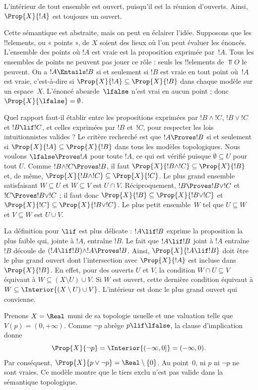 \documentclass[../../../include/open-logic-section]{subfiles}
\begin{document}
L'intérieur de tout ensemble est ouvert, puisqu'il est la réunion
d'ouverts. Ainsi, $\Prop{X}{!A}$ est toujours un ouvert.

Cette sémantique est abstraite, mais on peut en éclairer l'idée.
Supposons que les !!{element}s, ou « points », de $X$ soient des lieux
où l'on peut évaluer les énoncés. L'ensemble des points où $!A$ est
vraie est la proposition exprimée par~$!A$. Tous les ensembles de
points ne peuvent pas jouer ce rôle : seuls les !!{element}s de
$\Top{O}$ le peuvent. On a $!A \Entails !B$ si et seulement si $!B$
est vraie en tout point où~$!A$ est vraie, c'est-à-dire si
$\Prop{X}{!A} \subseteq \Prop{X}{!B}$ dans chaque modèle sur un
espace~$X$. L'énoncé absurde~$\lfalse$ n'est vrai en aucun point ;
donc $\Prop{X}{\lfalse} = \emptyset$.

Quel rapport faut-il établir entre les propositions exprimées par
$!B \land !C$, $!B \lor !C$ et $!B \lif !C$, et celles exprimées par
$!B$ et~$!C$, pour respecter les lois intuitionnistes valides ? Le
critère recherché est que $!A \Proves !B$ si et seulement si
$\Prop{X}{!A} \subseteq \Prop{X}{!B}$ dans tous les modèles
topologiques. Nous voulons $\lfalse \Proves !A$ pour toute $!A$,
ce qui est vérifié puisque $\emptyset \subseteq U$ pour tout $U$.
Comme $!B \land !C \Proves !B$, il faut
$\Prop{X}{!B \land !C} \subseteq \Prop{X}{!B}$ et, de même,
$\Prop{X}{!B \land !C} \subseteq \Prop{X}{!C}$. Le plus grand
ensemble satisfaisant $W \subseteq U$ et $W \subseteq V$ est
$U \cap V$. Réciproquement, $!B \Proves !B \lor !C$ et
$!C \Proves !B \lor !C$ ; il faut donc
$\Prop{X}{!B} \subseteq \Prop{X}{!B \lor !C}$ et
$\Prop{X}{!C} \subseteq \Prop{X}{!B \lor !C}$. Le plus petit
ensemble~$W$ tel que $U \subseteq W$ et $V \subseteq W$ est
$U \cup V$.

La définition pour $\lif$ est plus délicate : $!A \lif !B$ exprime la
proposition la plus faible qui, jointe à $!A$, entraîne $!B$. Le fait
que $!A \lif !B$ joint à $!A$ entraîne~$!B$ découle de
$(!A \lif !B) \land !A \Proves !B $. Ainsi, $\Prop{X}{!A \lif !B}$
doit être le plus grand ouvert dont l'intersection avec
$\Prop{X}{!A}$ est incluse dans $\Prop{X}{!B}$. En effet, pour
des ouverts $U$ et $V$, la condition $W\cap U\subseteq V$
équivaut à $W\subseteq (X\setminus U)\cup V$. Si $W$ est ouvert,
cette dernière condition équivaut à
$W\subseteq \Interior{(X\setminus U)\cup V}$. L'intérieur est
donc le plus grand ouvert qui convienne.

\begin{ex}
  Prenons $X=\Real$ muni de sa topologie usuelle et
  une valuation telle que $V(p)=(0,+\infty)$. Comme $\lnot p$
  abrège $p\lif\lfalse$, la clause d'implication donne
  \[
    \Prop{X}{\lnot p} = \Interior{(-\infty,0]} = (-\infty,0).
  \]
  Par conséquent, $\Prop{X}{p\lor\lnot p} = \Real\setminus\{0\}$.
  Au point~$0$, ni $p$ ni $\lnot p$ ne sont vraies. Ce modèle
  montre que le tiers exclu n'est pas valide dans la sémantique
  topologique.
\end{ex}
\end{document}
